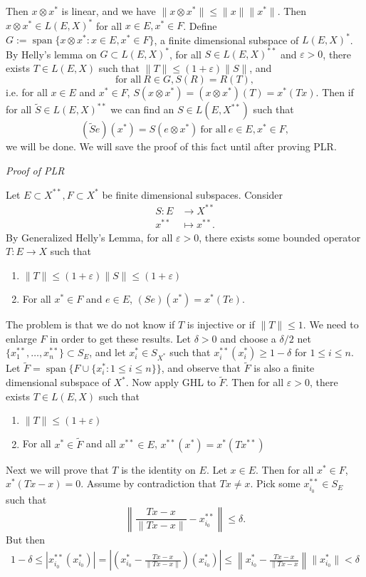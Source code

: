 \documentclass[11pt, reqno]{article}
\theoremstyle{plain}
\theoremstyle{definition}
\theoremstyle{remark}
\renewcommand{\epsilon}{\varepsilon}
\begin{document}
Then $x \otimes x^*$ is linear, and we have $\|x\otimes x^*\| \leq \|x\|\|x^*\|$. Then
$x\otimes x^* \in L(E, X)^*$ for all $x \in E, x^* \in F$.
\bigbreak
Define $G:= \operatorname{span}\{x\otimes x^*: x \in E, x^* \in F\}$, a finite dimensional subspace of $L(E, X)^*$.
By Helly's lemma on $G \subset L(E, X)^*$, for all $S \in L(E, X)^{**}$ and $\epsilon > 0$, there exists 
$T \in L(E, X)$ such that $\|T\|\leq (1 + \epsilon)\|S\|$, and 
\[
    \text{for all}\ R \in G, S(R) = R(T),
\]
i.e. for all $x \in E$ and $x^* \in F$, $S(x\otimes x^*) = (x \otimes x^*)(T) = x^*(Tx)$.
\bigbreak
Then if for all $\tilde{S} \in L(E, X)^{**}$ we can find an $S \in L(E, X^{**})$ such that 
\[
    (\tilde{S}e)(x^*) = S(e\otimes x^*)\ \text{for all}\ e \in E, x^* \in F,
\]
we will be done. We will save the proof of this fact until after proving PLR.

\textit{Proof of PLR}

Let $E \subset X^{**}, F \subset X^*$ be finite dimensional subspaces. Consider 
\begin{align*}
    S: E & \rightarrow X^{**}\\
    x^{**} & \mapsto x^{**}.
\end{align*}
By Generalized Helly's Lemma, for all $\epsilon > 0$, there exists some bounded operator $T: E \rightarrow X$ 
such that 
\begin{enumerate}
    \item $\|T\| \leq (1 + \epsilon)\|S\|\leq (1 + \epsilon)$
    \item For all $x^* \in F$ and $e \in E$, $(Se)(x^*) = x^*(Te)$.
\end{enumerate}
The problem is that we do not know if $T$ is injective or if $\|T\| \leq 1$.
\bigbreak
We need to enlarge $F$ in order to get these results. Let $\delta > 0$ and choose a $\delta/2$ net 
$\{x_1^{**}, \dots, x_n^{**}\} \subset S_E$, and let $x_i^* \in S_{X^*}$ such that $x_i^{**}(x_i^*) \geq 1 - \delta$
for $1 \leq i \leq n$. Let $\tilde{F} = \operatorname{span}\{F \cup \{x_i^*: 1 \leq i \leq n\}\}$, and observe that 
$\tilde{F}$ is also a finite dimensional subspace of $X^*$. Now apply GHL to $\tilde{F}$. Then for all $\epsilon > 0$,
there exists $T \in L(E, X)$ such that
\begin{enumerate}
    \item $\|T\| \leq (1 + \epsilon)$
    \item For all $x^* \in \tilde{F}$ and all $x^{**} \in E$, $x^{**}(x^*) = x^*(Tx^{**})$
\end{enumerate}
\bigbreak
Next we will prove that $T$ is the identity on $E$. Let $x \in E$. Then for all $x^* \in F$, 
$x^*(Tx - x) = 0$. Assume by contradiction that $Tx \neq x$. Pick some $x_{i_0}^{**} \in S_E$ such that 
\[
    \left\|\frac{Tx - x}{\|Tx - x\|} - x_{i_0}^{**}\right\| \leq \delta.
\]
But then 
\begin{align*}
    1 - \delta \leq |x^{**}_{i_0}(x_{i_0}^*)| = \left|\left(x_{i_0}^* - \frac{Tx - x}{\|Tx-x\|}\right)(x_{i_0}^*)\right|
    \leq \left\|x_{i_0}^* - \frac{Tx - x}{\|Tx - x}\right\|\|x_{i_0}^*\| < \delta
\end{align*}
\end{document}
